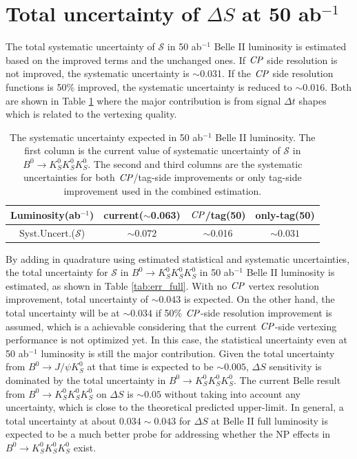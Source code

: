 \section{Total uncertainty of $\Delta S$ at 50 ab$^{-1}$}
The total systematic uncertainty of $\mathcal{S}$ in 50 ab$^{-1}$ Belle II luminosity is estimated based on the improved terms and the unchanged ones. If $\it{CP}$ side resolution is not improved, the systematic uncertainty is $\sim$0.031. If the $\it{CP}$ side resolution functions is 50\% improved, the systematic uncertainty is reduced to  $\sim0.016$. Both are shown in Table \ref{tab:sys_full} where the major contribution is from signal $\Delta t$ shapes which is related to the vertexing quality. 

\begin{table}[htpb]
	\centering
	\caption{The systematic uncertainty expected in 50 ab$^{-1}$ Belle II luminosity. The first column is the current value of systematic uncertainty of $\mathcal{S}$ in $B^0 \to K_S^0  K_S^0  K_S^0$. The second and third columns are the systematic uncertainties for both $\it{CP}$/tag-side improvements or only tag-side improvement used in the combined estimation.}
	\label{tab:sys_full}
	\begin{tabular}{c| c | c |c}
		\hline
		Luminosity(ab$^{-1}$) & current($\sim$0.063) & $\it{CP}$/tag(50)& only-tag(50)\\
		\hline
		Syst.Uncert.($\mathcal{S}$) & $\sim0.072$ & $\sim$0.016 & $\sim0.031$\\
		\hline
	\end{tabular}
\end{table}


By adding in quadrature using estimated statistical and systematic uncertainties, the total uncertainty for $\mathcal{S}$ in $B^0 \to K_S^0  K_S^0  K_S^0$ in 50 ab$^{-1}$ Belle II luminosity is estimated, as shown in Table \ref{tab:err_full}. With no $\it{CP}$ vertex resolution improvement, total uncertainty of $\sim 0.043$ is expected. On the other hand, the total uncertainty will be at $\sim 0.034$ if 50\% $\it{CP}$-side resolution improvement is assumed, which is a achievable considering that the current $\it{CP}$-side vertexing performance is not optimized yet. In this case, the statistical uncertainty even at 50 ab$^{-1}$ luminosity is still the major contribution. Given the total uncertainty from $B^0\to J/\psi K_S^0$ at that time is expected to be $\sim 0.005$\cite{b2book}, $\Delta S$ sensitivity is dominated by the total uncertainty in $B^0 \to K_S^0  K_S^0  K_S^0$. The current Belle result from $B^0 \to K_S^0  K_S^0  K_S^0$ on $\Delta S$ is $\sim0.05$ without taking into account any uncertainty, which is close to the theoretical predicted upper-limit. In general, a total uncertainty at about $0.034\sim 0.043$ for $\Delta S$ at Belle II full luminosity is expected to be a much better probe for addressing whether the NP effects in $B^0 \to K_S^0  K_S^0  K_S^0$ exist.

